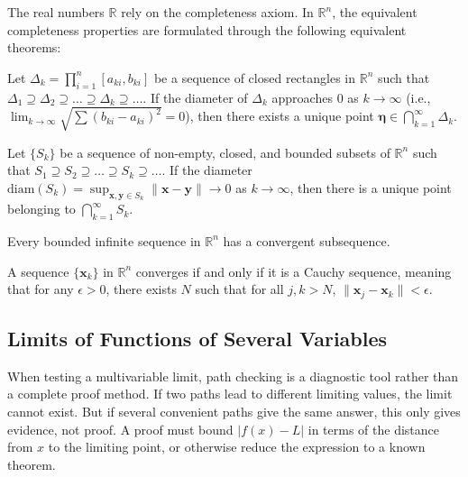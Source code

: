 The real numbers $\mathbb{R}$ rely on the completeness axiom. In $\mathbb{R}^n$, the equivalent completeness properties are formulated through the following equivalent theorems:

\begin{theorem}
Let $\Delta_k = \prod_{i=1}^n [a_{ki}, b_{ki}]$ be a sequence of closed rectangles in $\mathbb{R}^n$ such that $\Delta_1 \supseteq \Delta_2 \supseteq \dots \supseteq \Delta_k \supseteq \dots$. If the diameter of $\Delta_k$ approaches $0$ as $k \to \infty$ (i.e., $\lim_{k \to \infty} \sqrt{\sum (b_{ki} - a_{ki})^2} = 0$), then there exists a unique point $\mathbf{\eta} \in \bigcap_{k=1}^{\infty} \Delta_k$.
\end{theorem}

\begin{theorem}
Let $\{S_k\}$ be a sequence of non-empty, closed, and bounded subsets of $\mathbb{R}^n$ such that $S_1 \supseteq S_2 \supseteq \dots \supseteq S_k \supseteq \dots$. If the diameter $\text{diam}(S_k) = \sup_{\mathbf{x}, \mathbf{y} \in S_k} \|\mathbf{x} - \mathbf{y}\| \to 0$ as $k \to \infty$, then there is a unique point belonging to $\bigcap_{k=1}^{\infty} S_k$.
\end{theorem}

\begin{theorem}
Every bounded infinite sequence in $\mathbb{R}^n$ has a convergent subsequence.
\end{theorem}

\begin{theorem}
A sequence $\{\mathbf{x}_k\}$ in $\mathbb{R}^n$ converges if and only if it is a Cauchy sequence, meaning that for any $\epsilon > 0$, there exists $N$ such that for all $j, k > N$, $\|\mathbf{x}_j - \mathbf{x}_k\| < \epsilon$.
\end{theorem}

\subsection{Limits of Functions of Several Variables}


When testing a multivariable limit, path checking is a diagnostic tool rather than a complete proof method. If two paths lead to different limiting values, the limit cannot exist. But if several convenient paths give the same answer, this only gives evidence, not proof. A proof must bound $|f(x)-L|$ in terms of the distance from $x$ to the limiting point, or otherwise reduce the expression to a known theorem.

